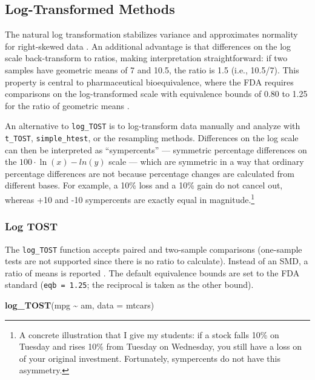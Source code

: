 \documentclass[]{interact}
\theoremstyle{plain}%
\theoremstyle{definition}
\theoremstyle{remark}
\newenvironment{Shaded}{\begin{snugshade}}{\end{snugshade}}
\newcommand{\AttributeTok}[1]{\textcolor[rgb]{0.13,0.29,0.53}{#1}}
\newcommand{\FunctionTok}[1]{\textcolor[rgb]{0.13,0.29,0.53}{\textbf{#1}}}
\newcommand{\NormalTok}[1]{#1}
\newcommand{\SpecialCharTok}[1]{\textcolor[rgb]{0.81,0.36,0.00}{\textbf{#1}}}
\begin{document}
\newpage

\subsection{Log-Transformed Methods}\label{log-transformed-methods}

The natural log transformation stabilizes variance and approximates
normality for right-skewed data \citep{logtest}. An additional advantage
is that differences on the log scale back-transform to ratios, making
interpretation straightforward: if two samples have geometric means of 7
and 10.5, the ratio is 1.5 (i.e., 10.5/7). This property is central to
pharmaceutical bioequivalence, where the FDA requires comparisons on the
log-transformed scale with equivalence bounds of 0.80 to 1.25 for the
ratio of geometric means \citep{fda, he2022}.

An alternative to \texttt{log\_TOST} is to log-transform data manually
and analyze with \texttt{t\_TOST}, \texttt{simple\_htest}, or the
resampling methods. Differences on the log scale can then be interpreted
as ``sympercents'' --- symmetric percentage differences on the
\(100 \cdot \ln(x) - ln(y)\) scale \citep{cole2000} --- which are
symmetric in a way that ordinary percentage differences are not because
percentage changes are calculated from different bases. For example, a
10\% loss and a 10\% gain do not cancel out, whereas +10 and -10
sympercents are exactly equal in magnitude.\footnote{A concrete
  illustration that I give my students: if a stock falls 10\% on Tuesday
  and rises 10\% from Tuesday on Wednesday, you still have a loss on of
  your original investment. Fortunately, sympercents do not have this
  asymmetry.}

\subsubsection{Log TOST}\label{log-tost}

The \texttt{log\_TOST} function accepts paired and two-sample
comparisons (one-sample tests are not supported since there is no ratio
to calculate). Instead of an SMD, a ratio of means is reported
\citep{lajeunesse2015bias}. The default equivalence bounds are set to
the FDA standard (\texttt{eqb\ =\ 1.25}; the reciprocal is taken as the
other bound).

\begin{Shaded}
\begin{Highlighting}[]
\FunctionTok{log\_TOST}\NormalTok{(mpg }\SpecialCharTok{\textasciitilde{}}\NormalTok{ am, }\AttributeTok{data =}\NormalTok{ mtcars)}
\end{Highlighting}
\end{Shaded}
\end{document}
